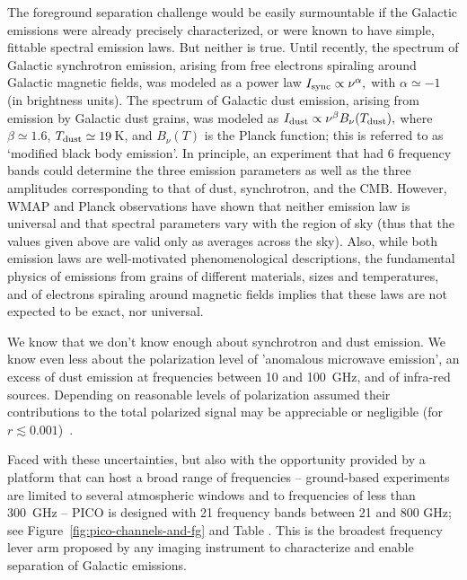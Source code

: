 \documentclass[PICOReport.tex]{subfiles}
\begin{document}
The foreground separation challenge would be easily surmountable if the Galactic emissions were already precisely characterized, or were known to have simple, fittable spectral emission laws. But neither is true. Until recently, the spectrum of Galactic synchrotron emission, arising from free electrons spiraling around Galactic magnetic fields, was modeled as a power law $I_{\rm sync} \propto \nu^{\alpha},$ with $\alpha \simeq -1$ (in brightness units). The spectrum of Galactic dust emission, arising from emission by Galactic dust grains, was modeled as $I_{\rm dust} \propto \nu^{\beta} B_\nu(T_{\rm dust}),$ where $\beta \simeq 1.6$, $T_{\rm dust} \simeq 19$\,K, and $B_\nu(T)$ is the Planck function; this is referred to as `modified black body emission'.  In principle, an experiment that had 6 frequency bands could determine the three emission parameters as well as the three amplitudes corresponding to that of dust, synchrotron, and the CMB. However, WMAP and Planck observations have shown that neither emission law is universal and that spectral parameters vary with the region of sky  (thus that the values given above are valid only as averages across the sky). Also, while both emission laws are well-motivated phenomenological descriptions, the fundamental physics of emissions from grains of different materials, sizes and temperatures, and of electrons spiraling around magnetic fields implies that these laws are not expected to be exact, nor universal. 

We know that we don't know enough about synchrotron and dust emission. We know even less about the polarization level of 'anomalous microwave emission', an excess of dust emission at frequencies between 10 and 100~GHz, and of infra-red sources. Depending on reasonable levels of polarization assumed their contributions to the total polarized signal may be appreciable or negligible (for $r\lesssim 0.001$)~\citep{??}.  

Faced with these uncertainties, but also with the opportunity provided by a platform that can host a broad range of frequencies -- ground-based experiments are limited to several atmospheric windows and to frequencies of less than 300~GHz -- PICO is designed with 21 frequency bands between 21 and 800 GHz; see Figure~\ref{fig:pico-channels-and-fg} and Table . This is the broadest frequency lever arm proposed by any imaging instrument to characterize and enable separation of Galactic emissions. 
\end{document}
